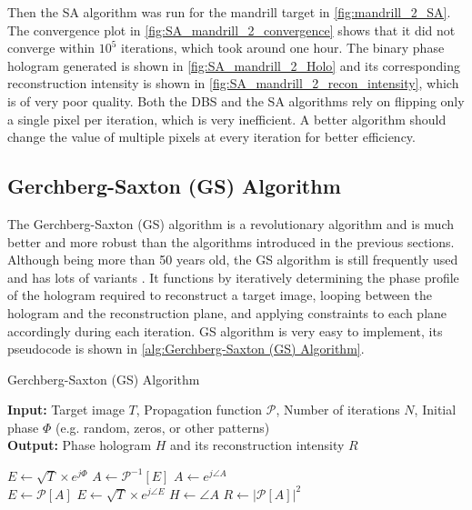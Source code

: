 Then the SA algorithm was run for the mandrill target in \cref{fig:mandrill_2_SA}. The convergence plot in \cref{fig:SA_mandrill_2_convergence} shows that it did not converge within $10^5$ iterations, which took around one hour. The binary phase hologram generated is shown in \cref{fig:SA_mandrill_2_Holo} and its corresponding reconstruction intensity is shown in \cref{fig:SA_mandrill_2_recon_intensity}, which is of very poor quality. Both the DBS and the SA algorithms rely on flipping only a single pixel per iteration, which is very inefficient. A better algorithm should change the value of multiple pixels at every iteration for better efficiency.


\subsection{Gerchberg-Saxton (GS) Algorithm}\label{sec:Gerchberg-Saxton (GS) Algorithm}
The Gerchberg-Saxton (GS) algorithm \cite{Gerchberg1972} is a revolutionary algorithm and is much better and more robust than the algorithms introduced in the previous sections. Although being more than 50 years old, the GS algorithm is still frequently used and has lots of variants \cite{Yang1994, WANG2017, Zhou2019}. It functions by iteratively determining the phase profile of the hologram required to reconstruct a target image, looping between the hologram and the reconstruction plane, and applying constraints to each plane accordingly during each iteration. GS algorithm is very easy to implement, its pseudocode is shown in \cref{alg:Gerchberg-Saxton (GS) Algorithm}.

\begin{algorithm}[H]
  \caption{Gerchberg-Saxton (GS) Algorithm}\label{alg:Gerchberg-Saxton (GS) Algorithm}
  \textbf{Input:} Target image $T$, Propagation function $\mathcal{P}$, Number of iterations $N$, Initial phase $\varPhi$ (e.g. random, zeros, or other patterns) \\
  \textbf{Output:} Phase hologram $H$ and its reconstruction intensity $R$
  \begin{algorithmic}
    \State $E \gets \sqrt{T} \times e^{j\varPhi}$
    \State $A \gets \mathcal{P}^{-1}[E]$
    \State $A \gets e^{j\angle A}$\\
    \State $E \gets \mathcal{P}[A]$
    \State $E \gets \sqrt{T} \times e^{j\angle E}$
    \EndFor
    \State $H \gets \angle A$
    \State $R \gets \vert \mathcal{P}[A] \vert ^2$
  \end{algorithmic}
\end{algorithm}

